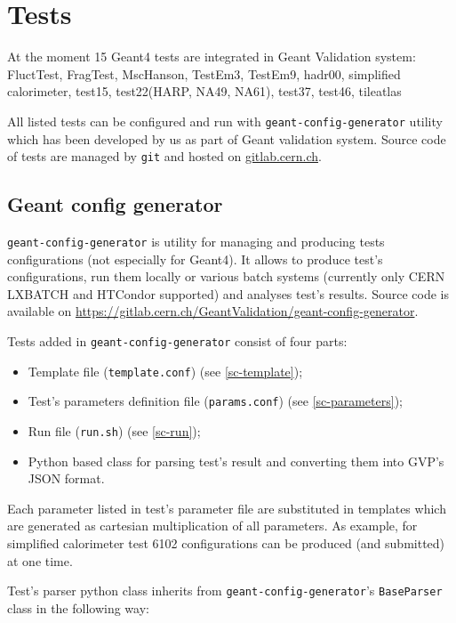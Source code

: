 \section{Tests}
\label{sec-tests}

At the moment 15 Geant4 tests are integrated in Geant Validation system: FluctTest, FragTest, MscHanson, TestEm3, TestEm9, hadr00, simplified calorimeter, test15, test22(HARP, NA49, NA61), test37, test46, tileatlas

All listed tests can be configured and run with {\tt geant-config-generator} utility which has been developed by us as part of Geant validation system. Source code of tests are managed by {\tt git} and hosted on \url{gitlab.cern.ch}.

\subsection{Geant config generator}
\label{sec-geant-config-generator}

{\tt geant-config-generator} is utility for managing and producing tests configurations (not especially for Geant4). It allows to produce test's configurations, run them locally or various batch systems (currently only CERN LXBATCH and HTCondor supported) and analyses test's results. Source code is available on \url{https://gitlab.cern.ch/GeantValidation/geant-config-generator}.

Tests added in {\tt geant-config-generator} consist of four parts:

\begin{itemize}
	\item Template file ({\tt template.conf}) (see \ref{sc-template});
	\item Test's parameters definition file ({\tt params.conf}) (see \ref{sc-parameters});
	\item Run file ({\tt run.sh}) (see \ref{sc-run});
	\item Python based class for parsing test's result and converting them into GVP's JSON format.
\end{itemize}

Each parameter listed in test's parameter file are substituted in templates which are generated as cartesian multiplication of all parameters. As example, for simplified calorimeter test 6102 configurations can be produced (and submitted) at one time.

Test's parser python class inherits from {\tt geant-config-generator}'s {\tt BaseParser} class in the following way:

